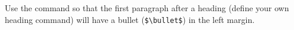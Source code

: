 Use the  command so that the first paragraph after a
heading (define your own heading command) will have a bullet
(\verb+$\bullet$+) in the left margin.
